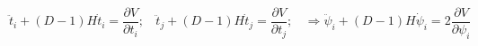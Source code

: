 \begin{equation}
\ddot{t}_i + (D-1) H \dot{t}_i = \frac{\partial V}{\partial t_i}; ~~~~
\ddot{t}_j + (D-1) H \dot{t}_j = \frac{\partial V}{\partial t_j}; ~~~~
\Rightarrow \ddot{\psi}_i + (D-1) H \dot{\psi}_i = 2\frac{\partial
V}{\partial \psi _i}
\end{equation}

